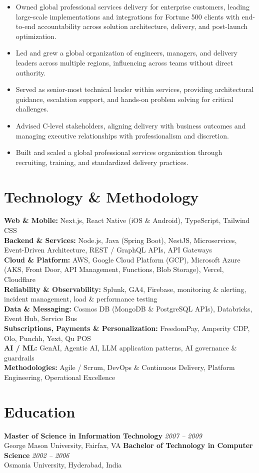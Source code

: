 \documentclass[11pt]{article}
\begin{document}
\begin{itemize}
  \item Owned global professional services delivery for enterprise customers, leading large-scale implementations and integrations for Fortune 500 clients with end-to-end accountability across solution architecture, delivery, and post-launch optimization.
  \item Led and grew a global organization of engineers, managers, and delivery leaders across multiple regions, influencing across teams without direct authority.
  \item Served as senior-most technical leader within services, providing architectural guidance, escalation support, and hands-on problem solving for critical challenges.
  \item Advised C-level stakeholders, aligning delivery with business outcomes and managing executive relationships with professionalism and discretion.
  \item Built and scaled a global professional services organization through recruiting, training, and standardized delivery practices.
\end{itemize}

\section*{Technology \& Methodology}
\textbf{Web \& Mobile:} Next.js, React Native (iOS \& Android), TypeScript, Tailwind CSS \\
\textbf{Backend \& Services:} Node.js, Java (Spring Boot), NestJS, Microservices, Event-Driven Architecture, REST / GraphQL APIs, API Gateways \\
\textbf{Cloud \& Platform:} AWS, Google Cloud Platform (GCP), Microsoft Azure (AKS, Front Door, API Management, Functions, Blob Storage), Vercel, Cloudflare \\
\textbf{Reliability \& Observability:} Splunk, GA4, Firebase, monitoring \& alerting, incident management, load \& performance testing \\
\textbf{Data \& Messaging:} Cosmos DB (MongoDB \& PostgreSQL APIs), Databricks, Event Hub, Service Bus \\
\textbf{Subscriptions, Payments \& Personalization:} FreedomPay, Amperity CDP, Olo, Punchh, Yext, Qu POS \\
\textbf{AI / ML:} GenAI, Agentic AI, LLM application patterns, AI governance \& guardrails \\
\textbf{Methodologies:} Agile / Scrum, DevOps \& Continuous Delivery, Platform Engineering, Operational Excellence

\section*{Education}
\textbf{Master of Science in Information Technology} \hfill \textit{2007 -- 2009} \\
George Mason University, Fairfax, VA
\newline
\textbf{Bachelor of Technology in Computer Science} \hfill \textit{2002 -- 2006} \\
Osmania University, Hyderabad, India
\end{document}
